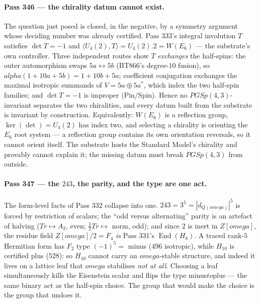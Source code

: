 \documentclass[12pt,a4paper]{article}
\def\mathbb#1{#1}%
\def\mathrm#1{#1}%
\def\textbf#1{#1}%
\def\omega{omega}%
\def\alpha{alpha}%
\def\to{ to }%
\theoremstyle{definition}
\newcommand{\PGSp}{\mathrm{PGSp}}
\newcommand{\FF}{\mathbb{F}}
\newcommand{\QQ}{\mathbb{Q}}
\newcommand{\ZZ}{\mathbb{Z}}
\begin{document}
\paragraph{Pass 346 --- the chirality datum cannot exist.}
The question just posed is closed, in the negative, by a symmetry argument
whose deciding number was already certified.  Pass 333's integral involution
$T$ satisfies $\det T=-1$ and $\langle U_4(2),T\rangle=U_4(2).2=W(E_6)$ --- the
substrate's own controller.  Three independent routes show $T$ \emph{exchanges}
the half-spins: the outer automorphism swaps $5a\leftrightarrow5b$ (BT866's
degree-$10$ fusion), so $\alpha(1{+}10a{+}5b)=1{+}10b{+}5a$; coefficient
conjugation exchanges the maximal isotropic summands of $V=5a\oplus5a^*$, which
index the two half-spin families; and $\det T=-1$ is improper (Pin/Spin).
Hence no $\PGSp(4,3)$-invariant separates the two chiralities, and every datum
built from the substrate is invariant by construction.  Equivalently: $W(E_6)$
is a reflection group, $\ker(\det)=U_4(2)$ has index two, and selecting a
chirality is orienting the $E_6$ root system --- \textbf{a reflection group
contains its own orientation reversals, so it cannot orient itself}.  The
substrate hosts the Standard Model's chirality and provably cannot explain it;
the missing datum must break $\PGSp(4,3)$ from outside.

\paragraph{Pass 347 --- the $243$, the parity, and the type are one act.}
The form-level facts of Pass 332 collapse into one.  $243=3^5=|d_{\QQ(\omega)}|^5$
is forced by restriction of scalars; the ``odd versus alternating'' parity is
an artefact of halving ($\mathrm{Tr}\mapsto A_2$, even; $\tfrac12\mathrm{Tr}\mapsto$
norm, odd); and since $2$ is inert in $\ZZ[\omega]$, the residue field
$\ZZ[\omega]/2=\FF_4$ \emph{is} Pass 331's $\operatorname{End}(H_8)$.  A traced
rank-$5$ Hermitian form has $\FF_2$ type $(-1)^5=$ minus ($496$ isotropic),
while $H_{10}$ is certified plus ($528$): so $H_{10}$ cannot carry an
$\omega$-stable structure, and indeed it lives on a lattice leaf that $\omega$
stabilises \emph{not at all}.  \textbf{Choosing a leaf simultaneously kills the
Eisenstein scalar and flips the type minus$\to$plus} --- the same binary act as
the half-spin choice.  The group that would make the choice is the group that
undoes it.
\end{document}
